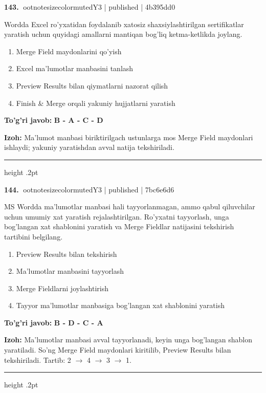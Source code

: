 \documentclass[10pt,a4paper]{article}
\begin{document}
\textbf{\color{ink}143.} {ootnotesizecolor{muted}Y3 | published | 4b395dd0}
\par
Wordda Excel ro'yxatidan foydalanib xatosiz shaxsiylashtirilgan sertifikatlar yaratish uchun quyidagi amallarni mantiqan bog'liq ketma-ketlikda joylang.
\begin{enumerate}[label=\Alph*),leftmargin=9mm]
\item Merge Field maydonlarini qo'yish
\item Excel ma'lumotlar manbasini tanlash
\item Preview Results bilan qiymatlarni nazorat qilish
\item Finish \& Merge orqali yakuniy hujjatlarni yaratish
\end{enumerate}
\begin{tcolorbox}[enhanced,breakable,colback=teal!4,colframe=teal!55!black,boxrule=0.45pt,arc=1.2mm,left=2.8mm,right=2.8mm,top=2mm,bottom=2mm]
\textbf{\color{teal}To'g'ri javob:} \textbf{B - A - C - D}
\par\smallskip
\textbf{Izoh:} Ma'lumot manbasi biriktirilgach ustunlarga mos Merge Field maydonlari ishlaydi; yakuniy yaratishdan avval natija tekshiriladi.
\end{tcolorbox}
\vspace{2mm}\hrule height .2pt\vspace{2mm}

\textbf{\color{ink}144.} {ootnotesizecolor{muted}Y3 | published | 7bc6e6d6}
\par
MS Wordda ma'lumotlar manbasi hali tayyorlanmagan, ammo qabul qiluvchilar uchun umumiy xat yaratish rejalashtirilgan. Ro'yxatni tayyorlash, unga bog'langan xat shablonini yaratish va Merge Fieldlar natijasini tekshirish tartibini belgilang.
\begin{enumerate}[label=\Alph*),leftmargin=9mm]
\item Preview Results bilan tekshirish
\item Ma'lumotlar manbasini tayyorlash
\item Merge Fieldlarni joylashtirish
\item Tayyor ma'lumotlar manbasiga bog'langan xat shablonini yaratish
\end{enumerate}
\begin{tcolorbox}[enhanced,breakable,colback=teal!4,colframe=teal!55!black,boxrule=0.45pt,arc=1.2mm,left=2.8mm,right=2.8mm,top=2mm,bottom=2mm]
\textbf{\color{teal}To'g'ri javob:} \textbf{B - D - C - A}
\par\smallskip
\textbf{Izoh:} Ma'lumotlar manbasi avval tayyorlanadi, keyin unga bog'langan shablon yaratiladi. So'ng Merge Field maydonlari kiritilib, Preview Results bilan tekshiriladi. Tartib: 2 \ensuremath{\rightarrow} 4 \ensuremath{\rightarrow} 3 \ensuremath{\rightarrow} 1.
\end{tcolorbox}
\vspace{2mm}\hrule height .2pt\vspace{2mm}
\end{document}
